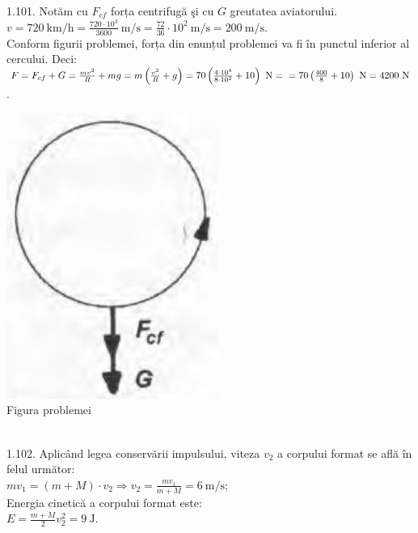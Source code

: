 1.101. Notăm cu $F_{c f}$ forța centrifugă şi cu $G$ greutatea aviatorului.\\ $v=720 \mathrm{~km} / \mathrm{h}=\frac{720 \cdot 10^{3}}{3600} \mathrm{~m} / \mathrm{s}=\frac{72}{36} \cdot 10^{2} \mathrm{~m} / \mathrm{s}=200 \mathrm{~m} / \mathrm{s}$.\\ Conform figurii problemei, forța din enunțul problemei va fi în punctul inferior al cercului. Deci:\\ $F=F_{c f}+G=\frac{m v^{2}}{R}+m g=m\left(\frac{v^{2}}{R}+g\right)=70\left(\frac{4 \cdot 10^{4}}{8 \cdot 10^{2}}+10\right) \mathrm{~N}=\\ =70\left(\frac{400}{8}+10\right) \mathrm{~N}=4200 \mathrm{~N}$.\\ \begin{center} \includegraphics[width=0.4\linewidth]{images/2025_07_01_5b3ff9fa0d508c8e9f17g-219}\\ Figura problemei \end{center}\\

1.102. Aplicând legea conservării impulsului, viteza $v_{2}$ a corpului format se află în felul următor:\\ $m v_{1}=(m+M) \cdot v_{2} \Rightarrow v_{2}=\frac{m v_{1}}{m+M}=6 \mathrm{~m} / \mathrm{s}$;\\ Energia cinetică a corpului format este:\\ $E=\frac{m+M}{2} v_{2}^{2}=9 \mathrm{~J}$.\\

